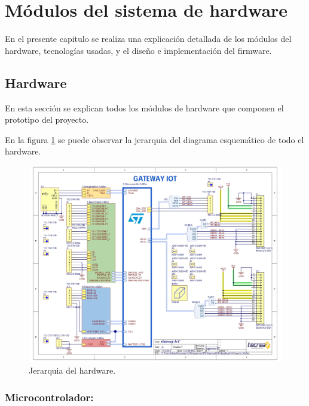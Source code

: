 \section{Módulos del sistema de hardware}
 
En el presente capitulo se realiza una explicación detallada de los módulos del hardware, tecnologías usadas, y el diseño e implementación del firmware.


\subsection{Hardware}

En esta sección se explican todos los módulos de hardware que componen el prototipo del proyecto.

En la figura \ref{fig:Hierarchy} se puede observar la jerarquia del diagrama esquemático de todo el hardware.

\begin{figure}[h]
	\centering
	\includegraphics[scale=.55]{./Figures/Hierarchy.jpg}
	\caption{Jerarquia del hardware.}
	\label{fig:Hierarchy}
\end{figure}

\subsubsection{Microcontrolador:}

